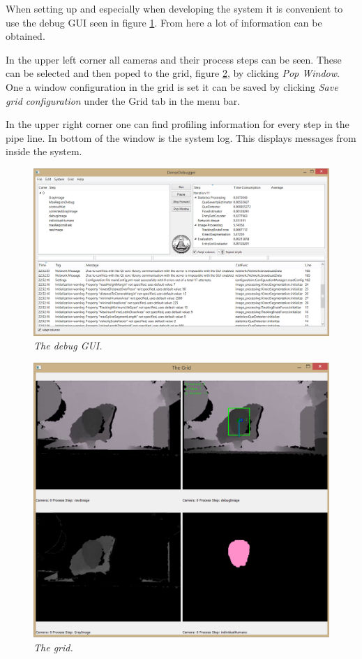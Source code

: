 
When setting up and especially when developing the system it is convenient to use the debug GUI seen in figure \ref{fig:debug GUI}. From here a lot of information can be obtained. 

In the upper left corner all cameras and their process steps can be seen. These can be selected and then poped to the grid, figure \ref{fig:grid}, by clicking \textit{Pop Window}. One a window configuration in the grid is set it can be saved by clicking \textit{Save grid configuration} under the Grid tab in the menu bar. 

In the upper right corner one can find profiling information for every step in the pipe line. In bottom of the window is the system log. This displays messages from inside the system. 

\begin{figure}[htb]
	\centering
	\includegraphics[width=\linewidth]{images/debugger.png}
	\caption[Overview of the entire system]{\textit{The debug GUI.}}
	\label{fig:debug GUI}  %
\end{figure}

\begin{figure}[htb]
	\centering
	\includegraphics[width=\linewidth]{images/grid.png}
	\caption[Overview of the entire system]{\textit{The grid.}}
	\label{fig:grid}  %
\end{figure}
